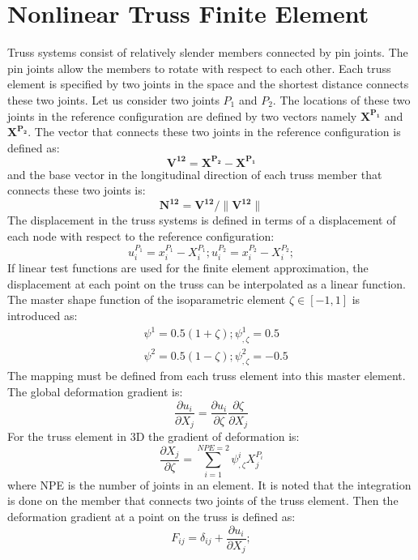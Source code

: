 \section{Nonlinear Truss Finite Element}
Truss systems consist of relatively slender members connected by pin joints.
The pin joints allow the members to rotate with respect to each other.
Each truss element is specified by two joints in the space and the shortest distance connects these two joints.
Let us consider two joints $P_1$ and $P_2$.
The locations of these two joints in the reference configuration are defined by two vectors namely $\mathbf {X^{P_1}}$ and $\mathbf {X^{P_2}}$.
The vector that connects these two joints in the reference configuration is defined as:
\begin{equation}
\mathbf {V^{12}=X^{P_2}-X^{P_1} } 
\end{equation}
and the base vector in the longitudinal direction of each truss member that connects these two joints is: 
\begin{equation}
\mathbf {N^{12}=V^{12}/ \|V^{12}\| }
\end{equation}
The displacement in the truss systems is defined in terms of a displacement of each node with respect to the reference configuration: 
\begin{equation}
u^{P_1}_i=x^{P_1}_i-X^{P_1}_i ; u^{P_2}_i=x^{P_2}_i-X^{P_2}_i ;  
\end{equation}
If linear test functions are used for the finite element approximation, the displacement at each point on the truss can be interpolated as a linear function. The master shape function of the isoparametric element $\zeta \in [-1,1]$ is introduced as:
\begin{equation}
\begin{aligned}
& \psi^1=0.5(1+\zeta); \psi^1_{,\zeta}= 0.5 \\
& \psi^2=0.5(1-\zeta); \psi^2_{,\zeta}=-0.5
\end{aligned}
\label{shape_function_truss} 
\end{equation}
The mapping must be defined from each truss element into this master element.
The global deformation gradient is:
\begin{equation}
\frac{\partial u_i}{\partial X_j}=\frac{\partial u_i}{\partial \zeta}
\frac{\partial \zeta}{\partial X_j}
\label{eqn:global_derivitave} 
\end{equation}
For the truss element in 3D the gradient of deformation is:
\begin{equation}
\frac{\partial X_j }{\partial \zeta}= 
  \sum_{i=1}^{NPE=2} \psi^i_{,\zeta} X^{P_i}_j 
\label{eqn:delXi_delzeta} 
\end{equation}
where NPE is the number of joints in an element.
It is noted that the integration is done on the member that connects two joints of the truss element.
Then the deformation gradient at a point on the truss is defined as:
\begin{equation}
F_{ij}=\delta_{ij}+ \frac{\partial u_i}{\partial X_j};  
\end{equation}
\\

